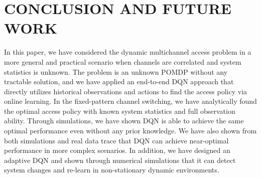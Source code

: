 \section*{  CONCLUSION AND FUTURE WORK   }

In this paper, we have considered the dynamic multichannel access problem in a more general and practical scenario when channels are correlated and system statistics is unknown. The problem is an unknown POMDP without any tractable solution, and we have applied an end-to-end DQN approach that directly utilizes historical observations and actions to ﬁnd the access policy via online learning. In the ﬁxed-pattern channel switching, we have analytically found the optimal access policy with known system statistics and full observation ability. Through simulations, we have shown DQN is able to achieve the same optimal performance even without any prior knowledge. We have also shown from both simulations and real data trace that DQN can achieve near-optimal performance in more complex scenarios. In addition, we have designed an adaptive DQN and shown through numerical simulations that it can detect system changes and re-learn in non-stationary dynamic environments.

